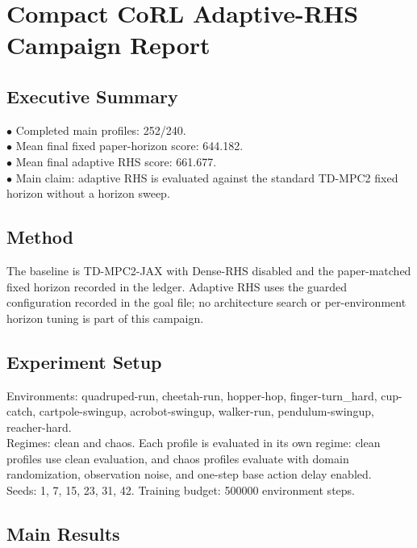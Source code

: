 \documentclass{article}
\begin{document}
\section*{Compact CoRL Adaptive-RHS Campaign Report}

\subsection*{Executive Summary}

\noindent $\bullet$ Completed main profiles: 252/240.\\
\noindent $\bullet$ Mean final fixed paper-horizon score: 644.182.\\
\noindent $\bullet$ Mean final adaptive RHS score: 661.677.\\
\noindent $\bullet$ Main claim: adaptive RHS is evaluated against the standard TD-MPC2 fixed horizon without a horizon sweep.\\

\subsection*{Method}

The baseline is TD-MPC2-JAX with Dense-RHS disabled and the paper-matched fixed horizon recorded in the ledger. Adaptive RHS uses the guarded configuration recorded in the goal file; no architecture search or per-environment horizon tuning is part of this campaign.\\

\subsection*{Experiment Setup}

Environments: quadruped-run, cheetah-run, hopper-hop, finger-turn\_hard, cup-catch, cartpole-swingup, acrobot-swingup, walker-run, pendulum-swingup, reacher-hard.\\

Regimes: clean and chaos. Each profile is evaluated in its own regime: clean profiles use clean evaluation, and chaos profiles evaluate with domain randomization, observation noise, and one-step base action delay enabled.\\

Seeds: 1, 7, 15, 23, 31, 42. Training budget: 500000 environment steps.\\

\subsection*{Main Results}
\end{document}
